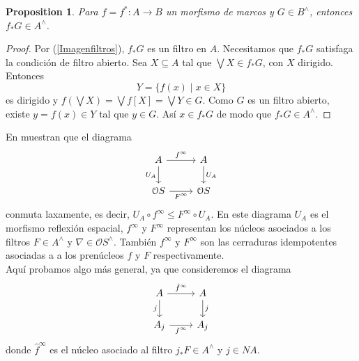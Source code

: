 \documentclass[11pt]{amsart}
\theoremstyle{plain}
\newtheorem{prop}[thm]{Proposition}
\theoremstyle{definition}
\begin{document}
\begin{prop}\label{fF}
Para $f=f^*\colon A\to B$ un morfismo de marcos y $G\in B^\wedge$, entonces $f_*G\in A^\wedge$.
\end{prop}

\begin{proof}
Por (\ref{Imagenfiltros}), $f_*G$ es un filtro en $A$. Necesitamos que $f_*G$ satisfaga la condición de filtro abierto. Sea $X\subseteq A$ tal que $\bigvee X\in f_*G$, con $X$ dirigido. Entonces
\[
Y=\{f(x)\mid x\in X\}
\] 
es dirigido y $f(\bigvee X)=\bigvee f[X]=\bigvee Y\in G$. Como $G$ es un filtro abierto, existe $y=f(x)\in Y$ tal que $y\in G$. Así $x\in f_*G$ de modo que $f_*G\in A^\wedge$.
\end{proof}

En \cite[Lema 8.9 y Corolario 8.10]{simmons2004vietoris} muestran que el diagrama
\[\begin{tikzcd}
	A & A \\
	{\mathcal{O}S} & {\mathcal{O}S}
	\arrow["{f^\infty}", from=1-1, to=1-2]
	\arrow["{U_A}"', from=1-1, to=2-1]
	\arrow["{U_A}", from=1-2, to=2-2]
	\arrow["{F^\infty}"', from=2-1, to=2-2]
\end{tikzcd}\]
conmuta laxamente, es decir, $U_A\circ f^\infty\leq F^\infty \circ U_A$. En este diagrama $U_A$ es el morfismo reflexión espacial, $f^\infty$ y $F^\infty$ representan los núcleos asociados a los filtros $F\in A^\wedge$ y $\nabla\in \mathcal{O}S^\wedge$. También $f^\infty$ y $F^\infty$ son las cerraduras idempotentes asociadas a 
a los prenúcleos $f$ y $F$ respectivamente.\\

Aquí probamos algo más general, ya que consideremos el diagrama
\[\begin{tikzcd}
	A & A \\
	{A_j} & {A_j}
	\arrow["{\hat{f}^\infty}", from=1-1, to=1-2]
	\arrow["j"', from=1-1, to=2-1]
	\arrow["j", from=1-2, to=2-2]
	\arrow["{f^\infty}"', from=2-1, to=2-2]
\end{tikzcd}\]
donde $\hat{f}^\infty$ es el núcleo asociado al filtro $j_*F\in A^\wedge$ y $j\in NA$.  
\end{document}

